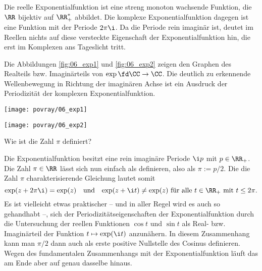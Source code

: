 \begin{antwort}
  Die reelle Exponentialfunktion ist eine streng monoton 
  wachsende Funktion, die $\RR$ bijektiv auf $\RR^*_+$ abbildet. 
  Die komplexe Exponentialfunktion dagegen ist eine 
   Funktion mit der Periode $2\pi \i$. 
  Da die Periode rein imaginär ist, deutet im Reellen nichts auf 
  diese versteckte Eigenschaft der Exponentialfunktion hin, die 
  erst im Komplexen ans Tageslicht tritt. 

  Die Abbildungen \ref{fig:06_exp1} und \ref{fig:06_exp2} 
  zeigen den Graphen des 
  Realteils bzw. Imaginärteils von $\exp\fd \CC\to\CC$. 
  Die deutlich zu erkennende Wellenbewegung in Richtung der imaginären 
  Achse ist ein Ausdruck der Periodizität der komplexen Exponentialfunktion. 
  \AntEnd

  \begin{minipage}{60mm}
    \texttt{[image: povray/06\_exp1]}
    \label{fig:06_exp1}
  \end{minipage}
  \qquad
  \begin{minipage}{60mm}
    \texttt{[image: povray/06\_exp2]}
    \label{fig:06_exp2}
  \end{minipage}
\end{antwort}

\begin{frage}
  Wie ist die Zahl $\pi$ definiert?
\end{frage}

\begin{antwort}
  Die Exponentialfunktion besitzt eine
  rein imaginäre Periode $\i p$ mit $p\in\RR_+$. 
  Die Zahl $\pi\in\RR$ lässt sich nun einfach als 
   definieren, 
  also als $ \pi := p/2$. Die die Zahl 
  $\pi$ charakterisierende Gleichung lautet somit 
  \[
  \exp( z+2\pi \i)=\exp(z) \quad\text{und\quad $\exp(z+\i t)\not=\exp(z)$ 
    für alle $t\in\RR_+$ mit $t\le 2\pi$.}
  \]
  Es ist vielleicht etwas praktischer -- und in aller Regel wird es auch 
  so gehandhabt --, sich der Periodizitätseigenschaften der Exponentialfunktion 
  durch die Untersuchung der reellen Funktionen $\cos t$ und $\sin t$ als 
  Real- bzw. Imaginärteil der Funktion $t\mapsto \exp(\i t)$ anzunähern. 
  In diesem Zusammenhang kann man $\pi/2$ dann auch als erste 
  positive Nullstelle des Cosinus definieren. Wegen des fundamentalen 
  Zusammenhangs mit der Exponentialfunktion läuft das am Ende aber auf genau  
  dasselbe hinaus. \AntEnd
\end{antwort}

